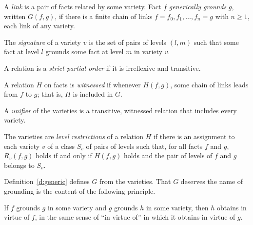 \documentclass{situationist-preprint}
\begin{document}
\begin{definition}\label{d:generic}
A \emph{link} is a pair of facts related by some variety. Fact $f$ \emph{generically grounds} $g$, written $G(f,g)$, if there is a finite chain of links $f = f_0, f_1, \ldots, f_n = g$ with $n \geq 1$, each link of any variety.
\end{definition}

\begin{definition}[Signature]\label{d:signature}
The \emph{signature} of a variety $v$ is the set of pairs of levels $(l, m)$ such that some fact at level $l$ grounds some fact at level $m$ in variety $v$.
\end{definition}

\begin{definition}\label{d:spo}
A relation is a \emph{strict partial order} if it is irreflexive and transitive.
\end{definition}

\begin{definition}[Witnessed]\label{d:witnessed}
A relation $H$ on facts is \emph{witnessed} if whenever $H(f,g)$, some chain of links leads from $f$ to $g$; that is, $H$ is included in $G$.
\end{definition}

\begin{definition}[Unifier]\label{d:unifier}
A \emph{unifier} of the varieties is a transitive, witnessed relation that includes every variety.
\end{definition}

\begin{definition}\label{d:restrictions}
The varieties are \emph{level restrictions} of a relation $H$ if there is an assignment to each variety $v$ of a class $S_v$ of pairs of levels such that, for all facts $f$ and $g$, $R_v(f,g)$ holds if and only if $H(f,g)$ holds and the pair of levels of $f$ and $g$ belongs to $S_v$.
\end{definition}

Definition~\ref{d:generic} defines $G$ from the varieties. That $G$ deserves the name of grounding is the content of the following principle.

\begin{principle}\label{p:mixed}
If $f$ grounds $g$ in some variety and $g$ grounds $h$ in some variety, then $h$ obtains in virtue of $f$, in the same sense of \enquote{in virtue of} in which it obtains in virtue of $g$.
\end{principle}
\end{document}
